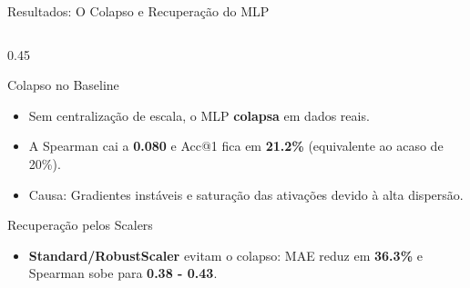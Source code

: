 \documentclass[aspectratio=169, 10pt]{beamer}
\begin{document}
\begin{frame}{Resultados: O Colapso e Recuperação do MLP}
  \begin{columns}[T]
    \begin{column}{0.45\textwidth}
      \begin{block}{Colapso no Baseline}
        \small
        \begin{itemize}
          \item Sem centralização de escala, o MLP \textbf{colapsa} em dados reais.
          \item A Spearman cai a \textbf{0.080} e Acc@1 fica em \textbf{21.2\%} (equivalente ao acaso de 20\%).
          \item Causa: Gradientes instáveis e saturação das ativações devido à alta dispersão.
        \end{itemize}
      \end{block}
      \begin{block}{Recuperação pelos Scalers}
        \small
        \begin{itemize}
          \item \textbf{Standard/RobustScaler} evitam o colapso: MAE reduz em \textbf{36.3\%} e Spearman sobe para \textbf{0.38 - 0.43}.
        \end{itemize}
      \end{block}
    \end{column}
    

\end{columns}
\end{frame}
\end{document}
